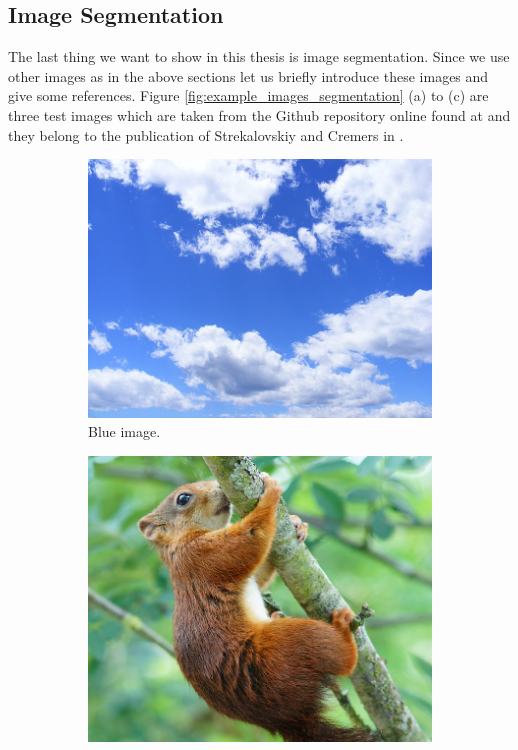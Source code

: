 \documentclass[abstracton]{scrreprt}
\begin{document}
        \subsection{Image Segmentation} %
        \label{sub:image_segmentation}
            The last thing we want to show in this thesis is image segmentation. Since we use other images as in the above sections let us briefly introduce these images and give some references. Figure \ref{fig:example_images_segmentation} (a) to (c) are three test images which are taken from the Github repository online found at \cite{FastMS} and they belong to the publication of Strekalovskiy and Cremers in \cite{Strekalovskiy-Cremers-eccv14}.\\
            \begin{figure}[!ht]
                \centering
                \begin{subfigure}[b]{0.245\textwidth}
                    \includegraphics[width=\textwidth]{img/images/blue.png}
                    \caption{Blue image.}
                \end{subfigure}
                \begin{subfigure}[b]{0.22\textwidth}
                    \includegraphics[width=\textwidth]{img/images/squirrel.png}

\end{subfigure}
\end{figure}
\end{document}
